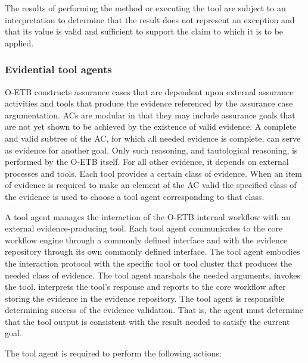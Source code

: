 \documentclass[12pt,twoside,a4paper]{article}
\begin{document}
The results of performing the method or executing the tool are subject to an interpretation to determine that the result does not represent an exception and that its value is valid and sufficient to support the claim to which it is to be applied.

\hypertarget{evidential-tool-agents}{%
\subsubsection{Evidential tool agents}\label{evidential-tool-agents}}

O-ETB constructs assurance cases that are dependent upon external assurance activities and tools that produce the evidence referenced by the assurance case argumentation. ACs are modular in that they may include assurance goals that are not yet shown to be achieved by the existence of valid evidence. A complete and valid subtree of the AC, for which all needed evidence is complete, can serve as evidence for another goal. Only such reasoning, and tautological reasoning, is performed by the O-ETB itself. For all other evidence, it depends on external processes and tools. Each tool provides a certain class of evidence. When an item of evidence is required to make an element of the AC valid the specified class of the evidence is used to choose a tool agent corresponding to that class.

A tool agent manages the interaction of the O-ETB internal workflow with an external evidence-producing tool. Each tool agent communicates to the core workflow engine through a commonly defined interface and with the evidence repository through its own commonly defined interface. The tool agent embodies the interaction protocol with the specific tool or tool cluster that produces the needed class of evidence. The tool agent marshals the needed arguments, invokes the tool, interprets the tool's response and reports to the core workflow after storing the evidence in the evidence repository. The tool agent is responsible determining success of the evidence validation. That is, the agent must determine that the tool output is consistent with the result needed to satisfy the current goal.

The tool agent is required to perform the following actions:
\end{document}
